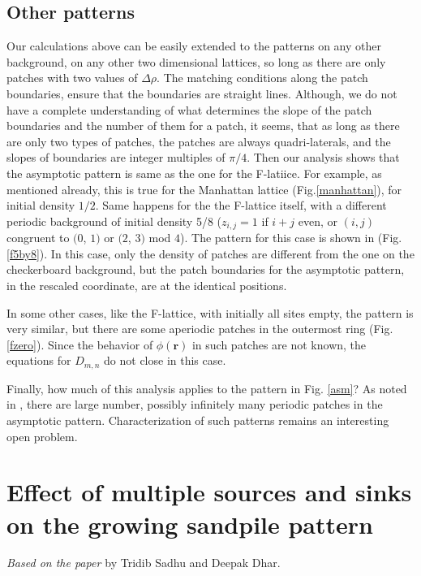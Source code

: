 \documentclass[11pt,a4paper]{book}
\begin{document}
\section{Other patterns}
Our calculations above can be easily extended to the patterns on any other
background, on any other two dimensional lattices, 
so long as there are only patches with two values of $\Delta \rho$. The
matching conditions along the patch boundaries, ensure that the
boundaries are straight lines. Although, we do not have a complete understanding
of what determines the slope of the patch boundaries and the number of them
for a patch, it seems, that as long as there are only two types of
patches, the patches are always quadri-laterals, and the slopes of
boundaries are integer multiples of $\pi/4$. Then our analysis shows
that the asymptotic pattern is same as the one for the F-latiice. For example,
as mentioned already, this is true for the Manhattan lattice (Fig.\ref{manhattan}), for initial 
density $1/2$.  Same happens for the the F-lattice itself, with a different periodic 
background of initial density 5/8 ($z_{i,j}=1$ if $i+j$ 
even, or $(i,j)$ congruent to $(0$, $1)$ or $(2$, $3)$ mod $4$). The
pattern for this case is shown in (Fig.\ref{f5by8}). In this case,
only the density of patches are different from the one on the
checkerboard background, but the patch boundaries for the asymptotic
pattern, in the rescaled coordinate, are at the identical positions.

In some other cases, like the F-lattice, with initially all sites empty, the pattern 
is very similar, but there are some aperiodic patches in the outermost 
ring (Fig.\ref{fzero}). Since the behavior of $\phi(\mathbf{r})$ in
such patches are not known, the equations for $D_{m,n}$ do not close in this case. 

Finally, how much of this analysis applies to the pattern in Fig.
\ref{asm}? As noted in \cite{ostojic}, there are large number,
possibly
infinitely many periodic patches in the asymptotic pattern.
Characterization of such patterns remains an interesting open problem.

\chapter{Effect of multiple sources
and sinks on the growing sandpile pattern\label{ch3}}
\textit{Based on the paper \cite{myjsp2}} by Tridib Sadhu and Deepak Dhar.
\end{document}
